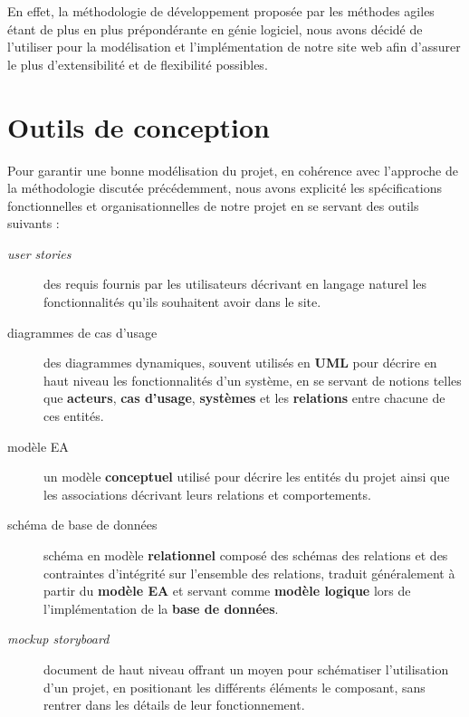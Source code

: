 \documentclass[a4paper,12pt]{report}
\theoremstyle{break}
\theoremstyle{break}
\theoremstyle{break}
\theoremstyle{break}
\theoremstyle{definition}
\theoremstyle{remark}
\begin{document}
En effet, la méthodologie de développement proposée par les méthodes agiles étant de plus en plus prépondérante en génie logiciel, nous avons décidé de l'utiliser pour la modélisation et l'implémentation de notre site web afin d'assurer le plus d'extensibilité et de flexibilité possibles.
\section{Outils de conception}
Pour garantir une bonne modélisation du projet, en cohérence avec l'approche de la méthodologie discutée précédemment, nous avons explicité les spécifications fonctionnelles et organisationnelles de notre projet en se servant des outils suivants :
\begin{description}
  \item[\textit{user stories}]{des requis fournis par les utilisateurs décrivant en langage naturel les fonctionnalités qu'ils souhaitent avoir dans le site.}
  \item[diagrammes de cas d'usage]{des diagrammes dynamiques, souvent utilisés en \textbf{UML} pour décrire en haut niveau les fonctionnalités d'un système, en se servant de notions telles que \textbf{acteurs}, \textbf{cas d'usage}, \textbf{systèmes} et les \textbf{relations} entre chacune de ces entités.}
  \item[modèle EA]{un modèle \textbf{conceptuel} utilisé pour décrire les entités du projet ainsi que les associations décrivant leurs relations et comportements.}
  \item[schéma de base de données]{schéma en modèle \textbf{relationnel} composé des schémas des relations et des contraintes d'intégrité sur l'ensemble des relations, traduit généralement à partir du \textbf{modèle EA} et servant comme \textbf{modèle logique} lors de l'implémentation de la \textbf{base de données}.}
  \item[\textit{mockup storyboard}]{document de haut niveau offrant un moyen pour schématiser l'utilisation d'un projet, en positionant les différents éléments le composant, sans rentrer dans les détails de leur fonctionnement.}
\end{description}
\end{document}
